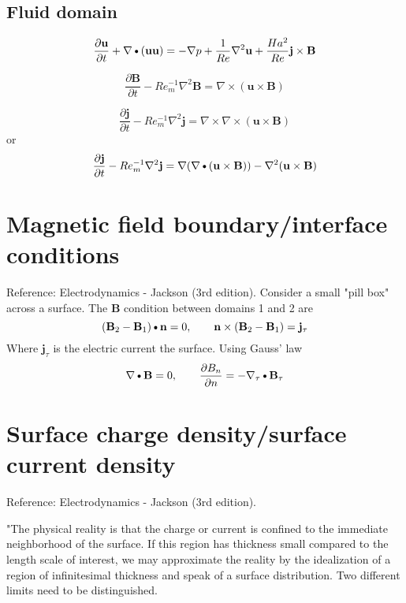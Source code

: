 \documentclass[11pt]{article}
\newcommand{\B}{\mathbf{B}}
\newcommand{\U}{\mathbf{u}}
\newcommand{\curl}{\nabla \times}
\newcommand{\PD}{\partial}
\newcommand{\J}{\mathbf{j}}
\newcommand{\N}{\mathbf{n}}
\newcommand{\DOT}{\text{\textbullet}}
\begin{document}
\subsection{Fluid domain}
\begin{equation}
  \frac{\PD \U}{\PD t} + \nabla \DOT (\U \U)
  = - \nabla p + \frac{1}{Re} \nabla^2 \U 
  + \frac{Ha^2}{Re} \J \times \B
\end{equation}

\begin{equation}
  \frac{\PD \B}{\PD t} - 
  Re_m^{-1} \nabla^2 \B = 
  \curl (\U \times \B)
\end{equation}

\begin{equation}
  \frac{\PD \J}{\PD t} - Re_m^{-1} \nabla^2 \J = \curl \curl (\U \times \B)
\end{equation}
or
\begin{equation}
  \frac{\PD \J}{\PD t} - Re_m^{-1} \nabla^2 \J = \nabla (\nabla \DOT (\U \times \B)) - \nabla^2 (\U \times \B)
\end{equation}

\section{Magnetic field boundary/interface conditions}
Reference: Electrodynamics - Jackson (3rd edition). Consider a small "pill box" across a surface. The $\B$ condition between domains 1 and 2 are
\begin{equation}
  (\B_2 - \B_1)\DOT \N = 0
  , \qquad
  \N \times (\B_2 - \B_1) = \J_{\tau}
\end{equation}
Where $\J_{\tau}$ is the electric current the surface. Using Gauss' law
\begin{equation}
    \nabla \DOT \B = 0
    , \qquad
    \frac{\PD B_n}{\PD n} = - \nabla_{\tau} \DOT \B_{\tau}
\end{equation}

\section{Surface charge density/surface current density}
Reference: Electrodynamics - Jackson (3rd edition).

"The physical reality is that the charge or current is confined to the immediate neighborhood of the surface. If this region has thickness small compared to the length scale of interest, we may approximate the reality by the idealization of a region of infinitesimal thickness and speak of a surface distribution. Two different limits need to be distinguished. 
\end{document}
